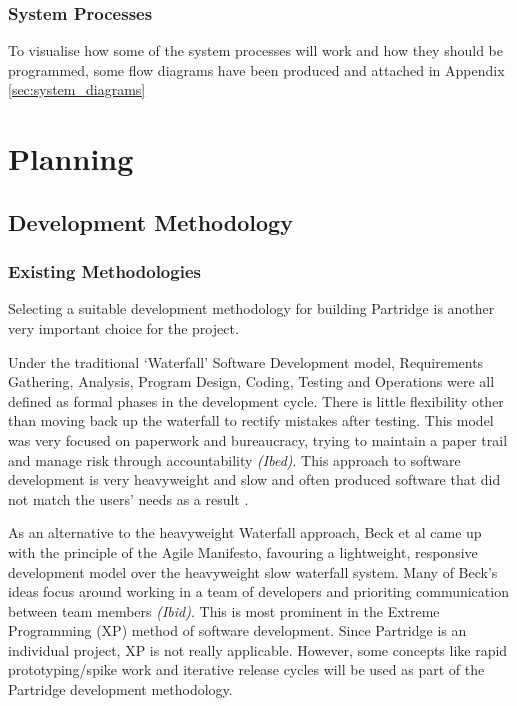 \documentclass[12pt,a4paper]{article}
\begin{document}
\subsubsection{System Processes}

To visualise how some of the system processes will work and how they should be
programmed, some flow diagrams have been produced and attached in Appendix
\ref{sec:system_diagrams}

\section{Planning}

\subsection{Development Methodology}

\subsubsection{Existing Methodologies}
Selecting a suitable development methodology for building Partridge is another
very important choice for the project.

Under the traditional `Waterfall' Software Development model, Requirements
Gathering, Analysis, Program Design, Coding, Testing and Operations were all
defined as formal phases in the development cycle. There is little flexibility
other than moving back up the waterfall to rectify mistakes after
testing\cite{Royce:1987:MDL:41765.41801}. This model was very focused on
paperwork and bureaucracy, trying to maintain a paper trail and manage risk
through accountability \emph{(Ibed)}. This approach to software development is
very heavyweight and slow and often produced software that did not match the
users' needs as a result \cite{Boehm1988}.

As an alternative to the heavyweight Waterfall approach, Beck et al came up
with the principle of the Agile Manifesto, favouring a lightweight, responsive
development model over the heavyweight slow waterfall
system\cite{beck2001agile}. Many of Beck's ideas focus around working in a team
of developers and prioriting communication between team members \emph{(Ibid)}.
This is most prominent in the Extreme Programming (XP) method of software
development. Since Partridge is an individual project, XP is not really
applicable. However, some concepts like rapid prototyping/spike work and
iterative release cycles will be used as part of the Partridge development
methodology.
\end{document}
